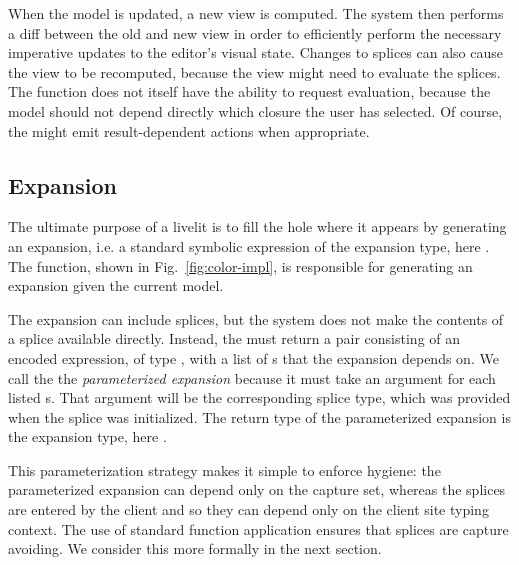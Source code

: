 When the model is updated, a new view is 
computed. The system then performs a diff between the old and new view in order to 
efficiently perform the necessary imperative updates to the editor's visual state.
Changes to splices can also cause the view to be recomputed, because the view might 
need to evaluate the splices. The  function does not itself 
have the ability to request evaluation, because the model should not depend directly  
which closure the user has selected. Of course, the  might emit 
result-dependent actions when appropriate.

\subsection{Expansion}
The ultimate purpose of a livelit is to fill the hole where it appears by generating an expansion,
i.e. a standard symbolic expression of the expansion type, here .
The  function, shown in Fig.~\ref{fig:color-impl}, is responsible for generating 
an expansion given the current model.

The expansion can include splices, but the system does not make the contents of a splice 
available directly. Instead, the  must return a pair consisting of an encoded expression, of type 
, with a list of s that the expansion depends on. 
We call the  the \emph{parameterized expansion}
 because it must take an argument for each listed s. 
 That argument will be the corresponding splice 
type, which was provided when the splice was initialized. 
 The return type of the parameterized expansion is the expansion type, here .

This parameterization strategy makes it simple to enforce hygiene: the parameterized expansion 
can depend only on the capture set, whereas the splices are entered by the client and so they can 
depend only on the client site typing context. The use of standard function application ensures
that splices are capture avoiding. We consider this more formally in the next section.
